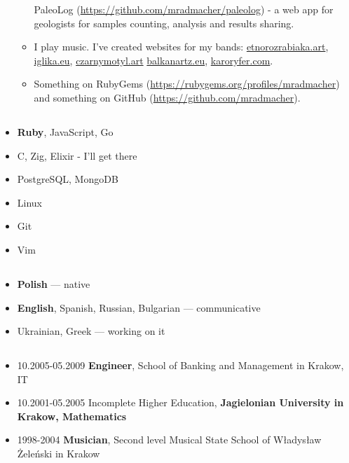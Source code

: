\documentclass[a4paper]{article}
\begin{document}
\begin{itemize}
\begin{itemize}
        PaleoLog (\href{https://github.com/mradmacher/paleolog}{https://github.com/mradmacher/paleolog}) - a web app for geologists for samples counting, analysis and results sharing.
      \item
        I play music. I've created websites for my bands: \href{https://etnorozrabiaka.art}{etnorozrabiaka.art}, \href{https://iglika.eu}{iglika.eu}, \href{https://czarnymotyl.art}{czarnymotyl.art} \href{https://balkanartz.eu}{balkanartz.eu}, \href{https://karoryfer.com}{karoryfer.com}.
      \item
        Something on RubyGems (\href{https://rubygems.org/profiles/mradmacher}{https://rubygems.org/profiles/mradmacher}) and something on GitHub (\href{https://github.com/mradmacher?tab=repositories}{https://github.com/mradmacher}).
    \end{itemize}
\end{itemize}

\subsection*{}
\begin{itemize}
\item
  \textbf{Ruby}, JavaScript, Go
\item
  C, Zig, Elixir - I'll get there
\item
  PostgreSQL, MongoDB
\item
  Linux
\item
  Git
\item
  Vim
\end{itemize}

\subsection*{}
\begin{itemize}
\item
  \textbf{Polish} --- native
\item
  \textbf{English}, Spanish, Russian, Bulgarian --- communicative
\item
  Ukrainian, Greek --- working on it
\end{itemize}

\subsection*{}
\begin{itemize}
  \item
    10.2005-05.2009 \textbf{Engineer}, School of Banking and Management in Krakow, IT

  \item
    10.2001-05.2005 Incomplete Higher Education,
    \textbf{Jagielonian University in Krakow, Mathematics}

  \item
    1998-2004 \textbf{Musician},
    Second level Musical State School of Władysław Żeleński in Krakow
\end{itemize}
\end{document}
